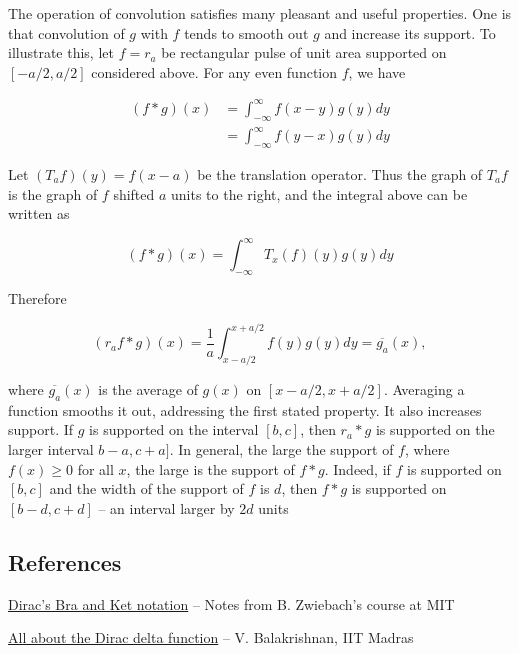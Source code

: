 The operation of convolution satisfies many pleasant and useful properties.  One is that convolution of $g$ with $f$ tends to smooth out $g$ and increase its support.  
To illustrate this, let $f = r_a$ be  rectangular pulse of unit area supported on $[-a/2, a/2]$ considered above.  For any even function $f$, we have 

\begin{align}
(f*g)(x) &= \int_{-\infty}^\infty  f(x - y) g(y) dy \\
 &= \int_{-\infty}^\infty  f(y -x) g(y) dy
\end{align}

Let $(T_a f)(y) = f(x-a)$ be the translation operator.  Thus the graph of $T_af$ is the graph of $f$ shifted $a$ units to the right, and the integral above can be written as

\begin{equation}
(f*g)(x) = \int_{-\infty}^\infty T_x(f)(y)g(y)  dy
\end{equation}

Therefore

\begin{equation}
(r_af*g)(x) =\frac{1}{a} \int_{x - a/2 }^{x + a/2 } f(y)g(y)  dy = \overline{g_a}(x),
\end{equation}

where $ \overline{g_a}(x) $ is the average of $g(x)$ on $[x - a/2, x + a/2]$.  Averaging a function smooths it out, addressing the first stated property.  It also increases support.  If $g$ is supported on the interval $[b,c]$, then $r_a*g$ is supported on the larger interval $b - a, c + a]$.  In general, the large the support of $f$, where $f(x) \ge 0$ for all $x$, the large is the support of $f*g$.  Indeed, if $f$ is supported on $[b,c]$ and the width of the support of $f$ is $d$, then $f*g$ is supported on $[b - d, c + d]$ -- an interval larger by $2d$ units


\subsection{References}

\href{http://ocw.mit.edu/courses/physics/8-05-quantum-physics-ii-fall-2013/lecture-notes/MIT8_05F13_Chap_04.pdf}{Dirac's Bra and Ket notation} -- Notes from B. Zwiebach's course at MIT

\href{http://www.physics.iitm.ac.in/~labs/dynamical/pedagogy/vb/delta.pdf}{All about the Dirac delta function} -- V. Balakrishnan, IIT Madras

